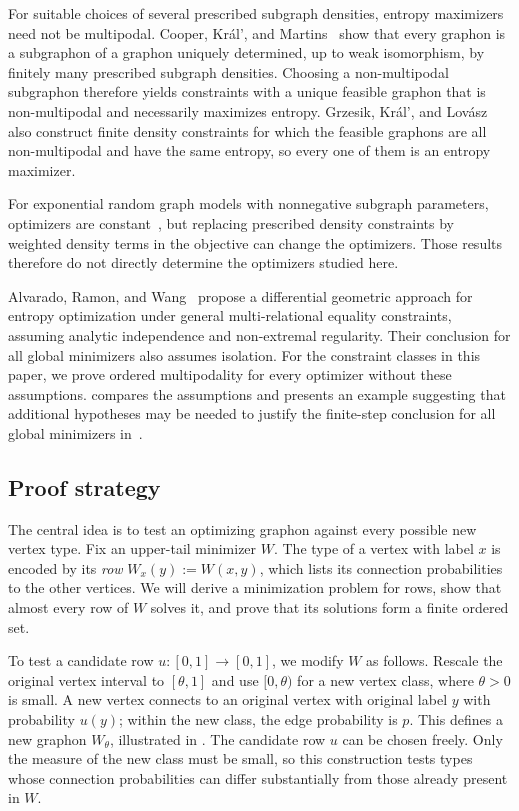 For suitable choices of several prescribed subgraph densities, entropy
maximizers need not be multipodal. Cooper, Kr\'al', and
Martins~\cite[Theorem~1]{CooperKralMartins2018} show that every graphon
is a subgraphon of a graphon uniquely determined, up to weak isomorphism,
by finitely many prescribed subgraph densities. Choosing a non-multipodal
subgraphon therefore yields constraints with a unique feasible graphon
that is non-multipodal and necessarily maximizes entropy.
Grzesik, Kr\'al', and Lov\'asz~\cite[Theorem~28]{GrzesikKralLovasz2020}
also construct finite density constraints for which the feasible graphons
are all non-multipodal and have the same entropy, so every one of them
is an entropy maximizer.

For exponential random graph models with nonnegative subgraph
parameters, optimizers are constant~\cite{ChatterjeeDiaconis2013}, but
replacing prescribed density constraints by weighted density terms in
the objective can change the optimizers. Those results therefore do not
directly determine the optimizers studied here.

Alvarado, Ramon, and Wang~\cite{AlvaradoRamonWang2026} propose a
differential geometric approach for entropy optimization under general
multi-relational equality constraints, assuming analytic independence
and non-extremal regularity. Their conclusion for all global minimizers
also assumes isolation. For the constraint classes in this paper,
we prove ordered multipodality for every optimizer without these assumptions.
 compares the assumptions and presents an example suggesting
that additional hypotheses may be needed to justify the finite-step
conclusion for all global minimizers in~\cite[Theorem~5.25]{AlvaradoRamonWang2026}.

\subsection{Proof strategy}\label{sec:proof-strategy}

The central idea is to test an optimizing graphon against every possible
new vertex type. Fix an upper-tail minimizer $W$. The type of a vertex
with label $x$ is encoded by its \emph{row} $W_x(y):=W(x,y)$, which lists
its connection probabilities to the other vertices. We will derive a
minimization problem for rows, show that almost every row of $W$ solves
it, and prove that its solutions form a finite ordered set.

To test a candidate row $u:[0,1]\to[0,1]$, we modify $W$ as follows.
Rescale the original vertex interval to $[\theta,1]$ and use
$[0,\theta)$ for a new vertex class, where $\theta>0$ is small. A new
vertex connects to an original vertex with original label $y$ with
probability $u(y)$; within the new class, the edge probability is $p$.
This defines a new graphon $W_\theta$, illustrated in
. The candidate row $u$ can be chosen freely. Only
the measure of the new class must be small, so this construction tests
types whose connection probabilities can differ substantially from
those already present in $W$.

